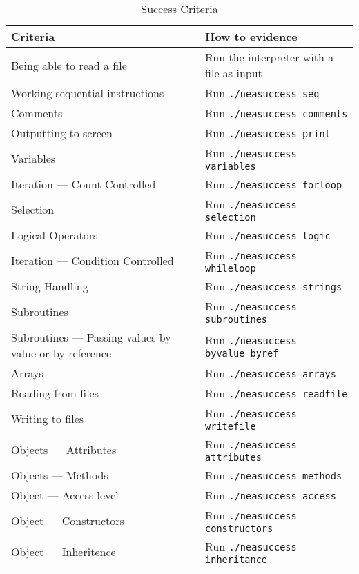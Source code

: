 \documentclass{article}
\begin{document}
\begin{table}
    \begin{adjustbox}{center}
        \begin{tabular}{|l|l|}
            \hline
            Criteria & How to evidence \\
            \hline
            Being able to read a file & Run the interpreter with a file as input \\
            \hline
            Working sequential instructions & Run \texttt{./neasuccess seq} \\
            \hline
            Comments & Run \texttt{./neasuccess comments} \\
            \hline
            Outputting to screen & Run \texttt{./neasuccess print} \\
            \hline
            Variables & Run \texttt{./neasuccess variables} \\
            \hline
            Iteration --- Count Controlled & Run \texttt{./neasuccess forloop}
            \\
            \hline
            Selection & Run \texttt{./neasuccess selection} \\
            \hline
            Logical Operators & Run \texttt{./neasuccess logic} \\
            \hline
            Iteration --- Condition Controlled & Run \texttt{./neasuccess
            whileloop} \\
            \hline
            String Handling & Run \texttt{./neasuccess strings} \\
            \hline
            Subroutines & Run \texttt{./neasuccess subroutines} \\
            \hline
            Subroutines --- Passing values by value or by reference & Run
            \texttt{./neasuccess byvalue\_byref} \\
            \hline
            Arrays & Run \texttt{./neasuccess arrays} \\
            \hline
            Reading from files & Run \texttt{./neasuccess readfile} \\
            \hline
            Writing to files & Run \texttt{./neasuccess writefile} \\
            \hline
            Objects --- Attributes & Run \texttt{./neasuccess attributes} \\
            \hline
            Objects --- Methods & Run \texttt{./neasuccess methods} \\
            \hline
            Object --- Access level & Run \texttt{./neasuccess access} \\
            \hline
            Object --- Constructors & Run \texttt{./neasuccess constructors} \\
            \hline
            Object --- Inheritence & Run \texttt{./neasuccess inheritance} \\
            \hline
        \end{tabular}
    \end{adjustbox}
    \caption{Success Criteria}
\end{table}
\end{document}
